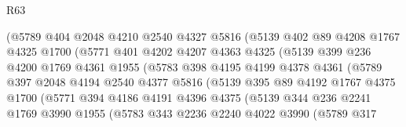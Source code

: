\begin{lexlean}{R63}
\begin{coremodule}
                      (@5789
                        @404
                        @2048
                        @4210
                        @2540
                        @4327
                        @5816
                        (@5139
                          @402
                          @89
                          @4208
                          @1767
                          @4325
                          @1700
                          (@5771
                            @401
                            @4202
                            @4207
                            @4363
                            @4325
                            (@5139
                              @399
                              @236
                              @4200
                              @1769
                              @4361
                              @1955
                              (@5783
                                @398
                                @4195
                                @4199
                                @4378
                                @4361
                                (@5789
                                  @397
                                  @2048
                                  @4194
                                  @2540
                                  @4377
                                  @5816
                                  (@5139
                                    @395
                                    @89
                                    @4192
                                    @1767
                                    @4375
                                    @1700
                                    (@5771
                                      @394
                                      @4186
                                      @4191
                                      @4396
                                      @4375
                                      (@5139
                                        @344
                                        @236
                                        @2241
                                        @1769
                                        @3990
                                        @1955
                                        (@5783
                                          @343
                                          @2236
                                          @2240
                                          @4022
                                          @3990
                                          (@5789
                                            @317

\end{coremodule}
\end{lexlean}
